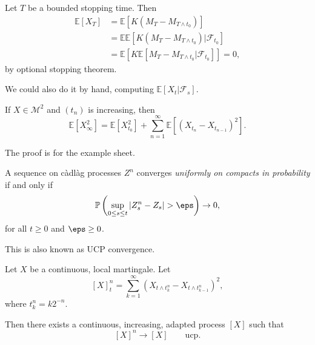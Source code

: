 \documentclass[12pt]{article}
\begin{document}
\begin{proofbox}
	Let $T$ be a bounded stopping time. Then
	\begin{align*}
		\mathbb{E}[X_T] &= \mathbb{E}[K(M_{T} - M_{T \wedge t_0})] \\
				&= \mathbb{E} \mathbb{E}[K(M_T - M_{T \wedge t_0}) | \mathcal{F}_{t_0}] \\
				&= \mathbb{E}[K \mathbb{E}[M_T - M_{T \wedge t_0} | \mathcal{F}_{t_0}]] = 0,
	\end{align*}
	by optional stopping theorem.

	We could also do it by hand, computing $\mathbb{E}[X_t | \mathcal{F}_s]$.
\end{proofbox}

\begin{proposition}
	If $X \in \mathcal{M}^2$ and $(t_n)$ is increasing, then
	\[
	\mathbb{E}[X_\infty^2] = \mathbb{E}[X_{t_0}^2] + \sum_{n = 1}^{\infty} \mathbb{E}[(X_{t_n} - X_{t_{n-1}})^2].
	\]
\end{proposition}

The proof is for the example sheet.

\begin{definition}
	A sequence on c\`adl\`ag processes $Z^{n}$ converges \emph{uniformly on compacts in probability} if and only if
	\[
	\mathbb{P}\left( \sup_{0 \leq s \leq t} |Z_s^{n} - Z_s| > \eps \right) \to 0,
	\]
	for all $t \geq 0$ and $\eps \geq 0$.
\end{definition}

This is also known as UCP convergence.

\begin{theorem}
	Let $X$ be a continuous, local martingale. Let
	\[
		[X]_t^{n} = \sum_{k = 1}^{\infty} (X_{t \wedge t_k^{n}} - X_{t \wedge t_{k-1}^{n}} )^2,
	\]
	where $t_k^{n} = k 2^{-n}$.

	Then there exists a continuous, increasing, adapted process $[X]$ such that
	\[
		[X]^{n} \to [X] \qquad \text{ucp}.
	\]
\end{theorem}
\end{document}
